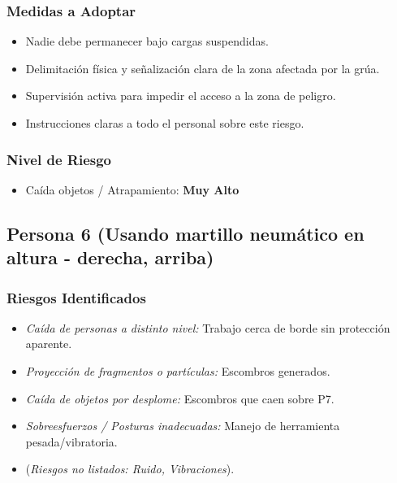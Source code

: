 \documentclass[12pt,a4paper]{article}
\begin{document}
	\subsubsection{Medidas a Adoptar}
	\begin{itemize}
		\item Nadie debe permanecer bajo cargas suspendidas.
		\item Delimitación física y señalización clara de la zona afectada por la grúa.
		\item Supervisión activa para impedir el acceso a la zona de peligro.
		\item Instrucciones claras a todo el personal sobre este riesgo.
	\end{itemize}
	
	\subsubsection{Nivel de Riesgo}
	\begin{itemize}
		\item Caída objetos / Atrapamiento: \textbf{Muy Alto}
	\end{itemize}
	
	\bigskip\hrulefill\bigskip
	
	\subsection{Persona 6 (Usando martillo neumático en altura - derecha, arriba)}
	
	\subsubsection{Riesgos Identificados}
	\begin{itemize}
		\item \textit{Caída de personas a distinto nivel:} Trabajo cerca de borde sin protección aparente.
		\item \textit{Proyección de fragmentos o partículas:} Escombros generados.
		\item \textit{Caída de objetos por desplome:} Escombros que caen sobre P7.
		\item \textit{Sobreesfuerzos / Posturas inadecuadas:} Manejo de herramienta pesada/vibratoria.
		\item (\textit{Riesgos no listados: Ruido, Vibraciones}).
	\end{itemize}
	
\end{document}
